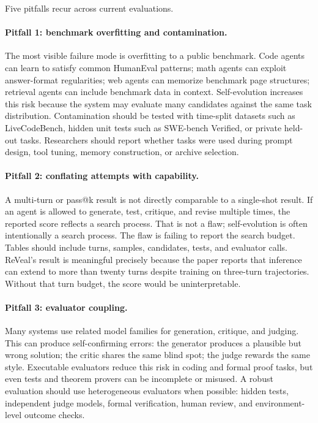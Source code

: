 Five pitfalls recur across current evaluations.

\paragraph{Pitfall 1: benchmark overfitting and contamination.}
The most visible failure mode is overfitting to a public benchmark. Code agents can learn to satisfy common HumanEval patterns; math agents can exploit answer-format regularities; web agents can memorize benchmark page structures; retrieval agents can include benchmark data in context. Self-evolution increases this risk because the system may evaluate many candidates against the same task distribution. Contamination should be tested with time-split datasets such as LiveCodeBench, hidden unit tests such as SWE-bench Verified, or private held-out tasks. Researchers should report whether tasks were used during prompt design, tool tuning, memory construction, or archive selection.

\paragraph{Pitfall 2: conflating attempts with capability.}
A multi-turn or pass@k result is not directly comparable to a single-shot result. If an agent is allowed to generate, test, critique, and revise multiple times, the reported score reflects a search process. That is not a flaw; self-evolution is often intentionally a search process. The flaw is failing to report the search budget. Tables should include turns, samples, candidates, tests, and evaluator calls. ReVeal's result is meaningful precisely because the paper reports that inference can extend to more than twenty turns despite training on three-turn trajectories. Without that turn budget, the score would be uninterpretable.

\paragraph{Pitfall 3: evaluator coupling.}
Many systems use related model families for generation, critique, and judging. This can produce self-confirming errors: the generator produces a plausible but wrong solution; the critic shares the same blind spot; the judge rewards the same style. Executable evaluators reduce this risk in coding and formal proof tasks, but even tests and theorem provers can be incomplete or misused. A robust evaluation should use heterogeneous evaluators when possible: hidden tests, independent judge models, formal verification, human review, and environment-level outcome checks.

